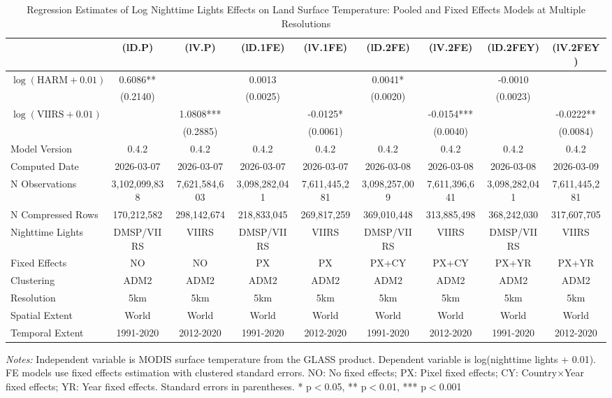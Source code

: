 \begin{table}[htbp]
\centering
\footnotesize
\caption{Regression Estimates of Log Nighttime Lights Effects on Land Surface Temperature: Pooled and Fixed Effects Models at Multiple Resolutions}
\begin{tabular}{lcccccccc}
\toprule
 & (lD.P) & (lV.P) & (lD.1FE) & (lV.1FE) & (lD.2FE) & (lV.2FE) & (lD.2FEY) & (lV.2FEY) \\
\midrule
$\log(\text{HARM} + 0.01)$ & 0.6086** &  & 0.0013 &  & 0.0041* &  & -0.0010 &  \\
 & (0.2140) &  & (0.0025) &  & (0.0020) &  & (0.0023) &  \\
$\log(\text{VIIRS} + 0.01)$ &  & 1.0808*** &  & -0.0125* &  & -0.0154*** &  & -0.0222** \\
 &  & (0.2885) &  & (0.0061) &  & (0.0040) &  & (0.0084) \\
\midrule
Model Version & 0.4.2 & 0.4.2 & 0.4.2 & 0.4.2 & 0.4.2 & 0.4.2 & 0.4.2 & 0.4.2 \\
Computed Date & 2026-03-07 & 2026-03-07 & 2026-03-07 & 2026-03-07 & 2026-03-08 & 2026-03-08 & 2026-03-08 & 2026-03-09 \\
N Observations & 3,102,099,838 & 7,621,584,603 & 3,098,282,041 & 7,611,445,281 & 3,098,257,009 & 7,611,396,641 & 3,098,282,041 & 7,611,445,281 \\
N Compressed Rows & 170,212,582 & 298,142,674 & 218,833,045 & 269,817,259 & 369,010,448 & 313,885,498 & 368,242,030 & 317,607,705 \\
\midrule
Nighttime Lights & DMSP/VIIRS & VIIRS & DMSP/VIIRS & VIIRS & DMSP/VIIRS & VIIRS & DMSP/VIIRS & VIIRS \\
Fixed Effects & NO & NO & PX & PX & PX+CY & PX+CY & PX+YR & PX+YR \\
Clustering & ADM2 & ADM2 & ADM2 & ADM2 & ADM2 & ADM2 & ADM2 & ADM2 \\
Resolution & 5km & 5km & 5km & 5km & 5km & 5km & 5km & 5km \\
Spatial Extent & World & World & World & World & World & World & World & World \\
Temporal Extent & 1991-2020 & 2012-2020 & 1991-2020 & 2012-2020 & 1991-2020 & 2012-2020 & 1991-2020 & 2012-2020 \\
\bottomrule
\end{tabular}
\begin{threeparttable}
\begin{tablenotes}\small
\item \textit{Notes:} Independent variable is MODIS surface temperature from the GLASS product. Dependent variable is log(nighttime lights + 0.01). FE models use  fixed effects estimation with clustered standard errors. NO: No fixed effects; PX: Pixel fixed effects; CY: Country×Year fixed effects; YR: Year fixed effects. Standard errors in parentheses. * p$<$0.05, ** p$<$0.01, *** p$<$0.001
\end{tablenotes}
\end{threeparttable}
\end{table}